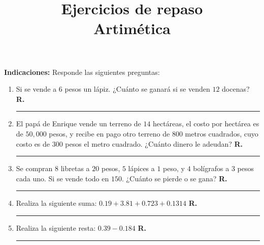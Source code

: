 

\title{Ejercicios de repaso \\ {\Large Artimética}\vspace{-3ex}}
\author{}
\date{ }



\maketitle
\fontsize{14}{14}\selectfont

\textbf{Indicaciones: } Responde las siguientes preguntas:

\begin{enumerate}
\item Si se vende a $6$ pesos un lápiz. ¿Cuánto se ganará si se venden $12$ docenas? \hspace{0.3cm} \textbf{R.} \rule{3cm}{0.1mm}
\item El papá de Enrique vende un terreno de $14$ hectáreas, el costo por hectárea es de $50,000$ pesos, y recibe en pago otro terreno de $800$ metros cuadrados, cuyo costo es de $300$ pesos el metro cuadrado. ¿Cuánto dinero le adeudan? \hspace{0.3cm} \textbf{R.} \rule{3cm}{0.1mm}
\item Se compran $8$ libretas a $20$ pesos, $5$ lápices a $1$ peso, y $4$ bolígrafos a $3$ pesos cada uno. Si se vende todo en $150$. ¿Cuánto se pierde o se gana? \hspace{0.3cm} \textbf{R.} \rule{3cm}{0.1mm}
\item Realiza la siguiente suma: $0.19 + 3.81 + 0.723 + 0.1314$ \hspace{0.3cm} \textbf{R.} \rule{3cm}{0.1mm}
\item Realiza la siguiente resta: $0.39 - 0.184$ \hspace{0.3cm} \textbf{R.} \rule{3cm}{0.1mm}
\end{enumerate}


